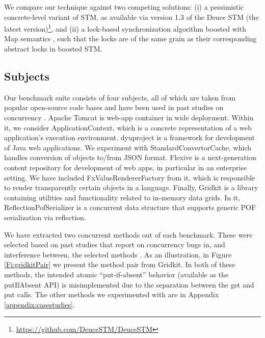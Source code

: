 We compare our technique against two competing solutions: (i) a pessimistic concrete-level variant of STM, as available via version 1.3 of the Deuce STM (the latest version)\footnote{
		\url{https://github.com/DeuceSTM/DeuceSTM}
	}, and (ii)  a lock-based synchronization algorithm boosted with {\sf Map} semantics \cite{ppopp/HerlihyK08}, such that the locks are of the same grain as their corresponding abstract locks in boosted STM.

\subsection{Subjects}

Our benchmark suite consists of four subjects, all of which are taken from popular open-source code bases and have been used in past studies on concurrency \cite{oopsla/ShachamBASVY11,issta/ShachamYGABSV14}.
	Apache Tomcat is web-app container in wide deployment. Within it, we consider {\sf ApplicationContext}, which is a concrete representation of a web application's execution environment.
	dyuproject is a framework for development of Java web applications. We experiment with {\sf StandardConvertorCache}, which handles conversion of objects to/from JSON format.
	Flexive is a next-generation content repository for development of web apps, in particular in an enterprise setting. We have included {\sf FxValueRendererFactory} from it, which is responsible to render transparently certain objects in a language.
	Finally, Gridkit is a library containing utilities and functionality related to in-memory data grids. In it, {\sf ReflectionPofSerializer} is a concurrent data structure that supports generic POF serialization via reflection.

We have extracted two concurrent methods out of each benchmark. These were selected based on past studies that report on concurrency bugs in, and interference between, the selected methods \cite{oopsla/ShachamBASVY11}. 
%
As an illustration, in Figure \ref{Fi:gridkitPair} we present the method pair from Gridkit. In both of these methods, the intended atomic ``put-if-absent'' behavior (available as the {\sf putIfAbsent} API) is misimplemented due to the separation between the {\sf get} and {\sf put} calls. The other methods we experimented with are in Appendix \ref{appendix:casestudies}.

